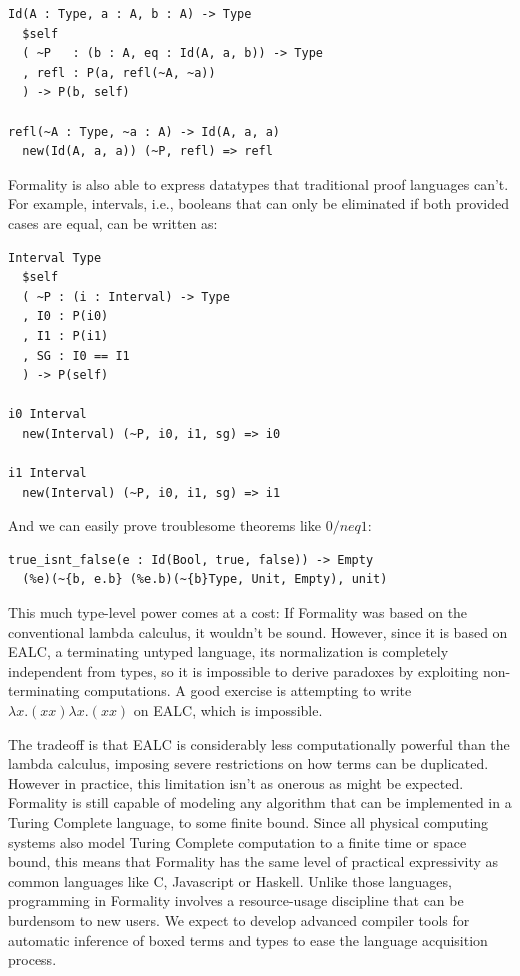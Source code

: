 \documentclass{article}
\theoremstyle{definition}
\theoremstyle{theorem}
\begin{document}
\begin{lstlisting}
Id(A : Type, a : A, b : A) -> Type
  $self
  ( ~P   : (b : A, eq : Id(A, a, b)) -> Type
  , refl : P(a, refl(~A, ~a))
  ) -> P(b, self)

refl(~A : Type, ~a : A) -> Id(A, a, a)
  new(Id(A, a, a)) (~P, refl) => refl
\end{lstlisting}

Formality is also able to express datatypes that traditional proof languages
can't. For example, intervals, i.e., booleans that can only be eliminated if
both provided cases are equal, can be written as:

\begin{lstlisting}
Interval Type
  $self
  ( ~P : (i : Interval) -> Type
  , I0 : P(i0)
  , I1 : P(i1)
  , SG : I0 == I1
  ) -> P(self)

i0 Interval
  new(Interval) (~P, i0, i1, sg) => i0

i1 Interval
  new(Interval) (~P, i0, i1, sg) => i1
\end{lstlisting}

And we can easily prove troublesome theorems like $0 /neq 1$: 

\begin{lstlisting}
true_isnt_false(e : Id(Bool, true, false)) -> Empty
  (%e)(~{b, e.b} (%e.b)(~{b}Type, Unit, Empty), unit)
\end{lstlisting}

This much type-level power comes at a cost: If Formality was based on the
conventional lambda calculus, it wouldn't be sound. However, since it is based
on EALC, a terminating untyped language, its normalization is completely
independent from types, so it is impossible to derive paradoxes by exploiting
non-terminating computations. A good exercise is attempting to write $\lambda x.
(x x) \lambda x.(x x)$ on EALC, which is impossible. 

The tradeoff is that EALC is considerably less computationally powerful than the
lambda calculus, imposing severe restrictions on how terms can be duplicated.
However in practice, this limitation isn't as onerous as might be expected.
Formality is still capable of modeling any algorithm that can be implemented in
a Turing Complete language, to some finite bound. Since all physical computing
systems also model Turing Complete computation to a finite time or space bound,
this means that Formality has the same level of practical expressivity as
common languages like C, Javascript or Haskell. Unlike those languages,
programming in Formality involves a resource-usage discipline that can be
burdensom to new users. We expect to develop advanced compiler tools for
automatic inference of boxed terms and types to ease the language acquisition
process.
\end{document}
